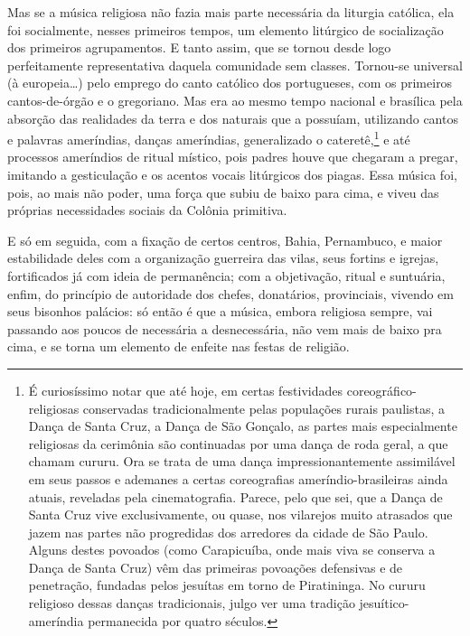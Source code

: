 Mas se a música religiosa não fazia mais parte necessária da liturgia
católica, ela foi socialmente, nesses primeiros tempos, um elemento
litúrgico de socialização dos primeiros agrupamentos. E tanto assim, que
se tornou desde logo perfeitamente representativa daquela comunidade sem
classes. Tornou-se universal (à europeia\ldots{}) pelo emprego do canto
católico dos portugueses, com os primeiros cantos-de-órgão e o
gregoriano. Mas era ao mesmo tempo nacional e brasílica pela absorção
das realidades da terra e dos naturais que a possuíam, utilizando cantos
e palavras ameríndias, danças ameríndias, generalizado o cateretê,\footnote{É curiosíssimo notar que até hoje, em certas festividades
  coreográfico-religiosas conservadas tradicionalmente pelas populações
  rurais paulistas, a Dança de Santa Cruz, a Dança de São Gonçalo, as
  partes mais especialmente religiosas da cerimônia são continuadas por
  uma dança de roda geral, a que chamam cururu. Ora se trata de uma
  dança impressionantemente assimilável em seus passos e ademanes a
  certas coreografias ameríndio-brasileiras ainda atuais, reveladas pela
  cinematografia. Parece, pelo que sei, que a Dança de Santa Cruz vive
  exclusivamente, ou quase, nos vilarejos muito atrasados que jazem nas
  partes não progredidas dos arredores da cidade de São Paulo. Alguns
  destes povoados (como Carapicuíba, onde mais viva se conserva a Dança
  de Santa Cruz) vêm das primeiras povoações defensivas e de penetração,
  fundadas pelos jesuítas em torno de Piratininga. No cururu religioso
  dessas danças tradicionais, julgo ver uma tradição jesuítico-ameríndia
  permanecida por quatro séculos.} e
até processos ameríndios de ritual místico, pois padres houve que
chegaram a pregar, imitando a gesticulação e os acentos vocais
litúrgicos dos piagas. Essa música foi, pois, ao mais não poder, uma
força que subiu de baixo para cima, e viveu das próprias necessidades
sociais da Colônia primitiva.

E só em seguida, com a fixação de certos centros, Bahia, Pernambuco, e
maior estabilidade deles com a organização guerreira das vilas, seus
fortins e igrejas, fortificados já com ideia de permanência; com a
objetivação, ritual e suntuária, enfim, do princípio de autoridade dos
chefes, donatários, provinciais, vivendo em seus bisonhos palácios: só
então é que a música, embora religiosa sempre, vai passando aos poucos
de necessária a desnecessária, não vem mais de baixo pra cima, e se
torna um elemento de enfeite nas festas de religião.

